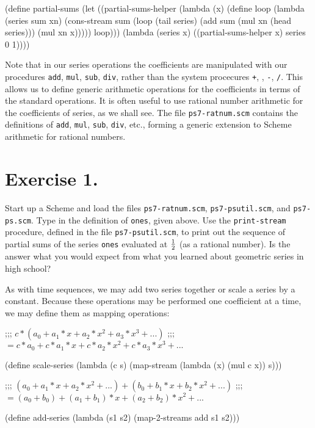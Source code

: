 \beginlisp
(define partial-sums
  (let ((partial-sums-helper
         (lambda (x)
           (define loop
             (lambda (series sum xn)
               (cons-stream sum
                            (loop (tail series)
                                  (add sum (mul xn (head series)))
                                  (mul xn x)))))
           loop)))
    (lambda (series x)
      ((partial-sums-helper x) series 0 1))))
\endlisp

Note that in our series operations the coefficients are manipulated
with our procedures {\tt add}, {\tt mul}, {\tt sub}, {\tt div},
rather than the system
procecures {\tt +}, {\tt *}, {\tt -}, {\tt /}.
This allows us to define generic arithmetic
operations for the coefficients in terms of the standard operations.
It is often useful to use rational number arithmetic for the
coefficients of series, as we shall see.  The file {\tt ps7-ratnum.scm}
contains
the definitions of {\tt add}, {\tt mul}, {\tt sub}, {\tt div},
etc., forming a generic
extension to Scheme arithmetic for rational numbers.

\section{Exercise 1.}
Start up a Scheme and load the files {\tt ps7-ratnum.scm},
{\tt ps7-psutil.scm}, and
{\tt ps7-ps.scm}.  Type in the definition of {\tt ones}, given above.  Use the
{\tt print-stream} procedure, defined in the file {\tt ps7-psutil.scm},
to print out
the sequence of partial sums of the series {\tt ones} evaluated at $1\over2$ 
(as a rational number). Is
the answer what you would expect from what you learned about geometric
series in high school?


As with time sequences, we may add two series together or scale a
series by a constant.  Because these operations may be performed one
coefficient at a time, we may define them as mapping operations:

\beginlisp
;;; $c*(a_0 + a_1*x + a_2*x^2 + a_3*x^3 + ...)$
;;;  $= c*a_0 + c*a_1*x + c*a_2*x^2 + c*a_3*x^3 + ...$

(define scale-series
  (lambda (c s)
    (map-stream (lambda (x) (mul c x))
                s)))
\endlisp

\beginlisp
;;; $(a_0 + a_1*x + a_2*x^2 + ...) + (b_0 + b_1*x + b_2*x^2 + ...)$
;;;  $= (a_0+b_0) + (a_1+b_1)*x + (a_2+b_2)*x^2 + ...$

(define add-series
  (lambda (s1 s2)
    (map-2-streams add s1 s2)))
\endlisp

